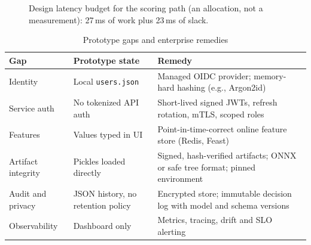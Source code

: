 \documentclass[conference]{IEEEtran}
\newcommand{\tabfont}{\footnotesize}
\begin{document}
\begin{figure}[!t]
\centering
{}
\caption{Design latency budget for the scoring path (an allocation, not a measurement): 27\,ms of work plus 23\,ms of slack.}
\label{fig:budget}
\end{figure}

\begin{table}[!t]
\caption{Prototype gaps and enterprise remedies}\label{tab:gaps}
\centering\tabfont
\begin{tabularx}{\columnwidth}{@{}l Y Y@{}}
\toprule
\textbf{Gap} & \textbf{Prototype state} & \textbf{Remedy}\\
\midrule
Identity & Local \texttt{users.json} & Managed OIDC provider; memory-hard hashing (e.g., Argon2id)\\
Service auth & No tokenized API auth & Short-lived signed JWTs, refresh rotation, mTLS, scoped roles\\
Features & Values typed in UI & Point-in-time-correct online feature store (Redis, Feast)\\
Artifact integrity & Pickles loaded directly & Signed, hash-verified artifacts; ONNX or safe tree format; pinned environment\\
Audit and privacy & JSON history, no retention policy & Encrypted store; immutable decision log with model and schema versions\\
Observability & Dashboard only & Metrics, tracing, drift and SLO alerting\\
\bottomrule
\end{tabularx}
\end{table}
\end{document}
